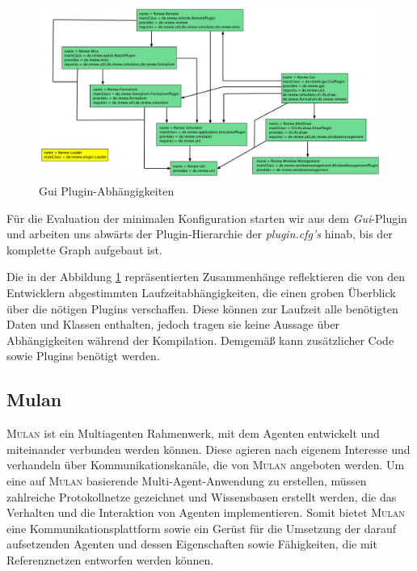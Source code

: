 		\begin{figure}[h!]
		  \centering
		  \includegraphics[width=\textwidth]{material/images/renew_plugin_dependencies2.pdf}
		  \caption{Gui Plugin-Abhängigkeiten}
		  \label{fig:plugin_deps}
		\end{figure}

		Für die Evaluation der minimalen Konfiguration starten wir aus dem \textit{Gui}-Plugin und arbeiten uns abwärts der Plugin-Hierarchie der \textit{plugin.cfg's} hinab, bis der komplette Graph aufgebaut ist.\newline

		Die in der Abbildung \ref{fig:plugin_deps} repräsentierten Zusammenhänge reflektieren die von den Entwicklern abgestimmten Laufzeitabhängigkeiten, die einen groben Überblick über die nötigen Plugins verschaffen. Diese können zur Laufzeit alle benötigten Daten und Klassen enthalten, jedoch tragen sie keine Aussage über Abhängigkeiten während der Kompilation. Demgemäß kann zusätzlicher Code sowie Plugins benötigt werden. 

	\subsection{Mulan} \label{sub:mulan}
		\textsc{Mulan} \cite{Roelke04} ist ein Multiagenten Rahmenwerk, mit dem Agenten entwickelt und miteinander verbunden werden können. Diese agieren nach eigenem Interesse und verhandeln über Kommunikationskanäle, die von \textsc{Mulan} angeboten werden. Um eine auf \textsc{Mulan} basierende Multi-Agent-Anwendung zu erstellen, müssen zahlreiche Protokollnetze gezeichnet und Wissensbasen erstellt werden, die das Verhalten und die Interaktion von Agenten implementieren. Somit bietet \textsc{Mulan} eine Kommunikationsplattform sowie ein Gerüst für die Umsetzung der darauf aufsetzenden Agenten und dessen Eigenschaften sowie Fähigkeiten, die mit Referenznetzen entworfen werden können. \cite{Cabac10a} \bigbreak


